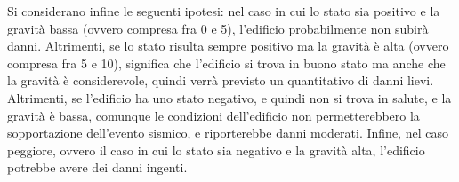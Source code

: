 \documentclass[12pt,a4paper]{report}
\begin{document}
                Si considerano infine le seguenti ipotesi: nel caso in cui lo stato sia positivo e la gravità bassa (ovvero compresa fra 0 e 5), l'edificio probabilmente non subirà danni. Altrimenti, se lo stato risulta sempre positivo ma la gravità è alta (ovvero compresa fra 5 e 10), significa che l'edificio si trova in buono stato ma anche che la gravità è considerevole, quindi verrà previsto un quantitativo di danni lievi. Altrimenti, se l'edificio ha uno stato negativo, e quindi non si trova in salute, e la gravità è bassa, comunque le condizioni dell'edificio non permetterebbero la sopportazione dell'evento sismico, e riporterebbe danni moderati. Infine, nel caso peggiore, ovvero il caso in cui lo stato sia negativo e la gravità alta, l'edificio potrebbe avere dei danni ingenti.
                
                
\end{document}
